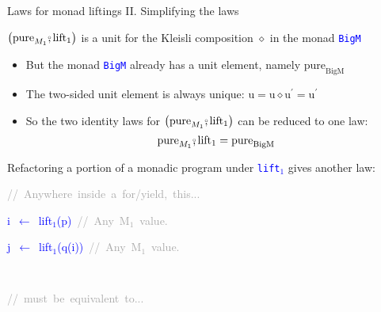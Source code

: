 \documentclass[english]{beamer}
\newenvironment{lyxcode}
  {\par\begin{list}{}{
    \setlength{\rightmargin}{\leftmargin}
    \setlength{\listparindent}{0pt}%
    \raggedright
    \setlength{\itemsep}{0pt}
    \setlength{\parsep}{0pt}
    \normalfont\ttfamily}%
   \def\{{\char`\{}
   \def\}{\char`\}}
   \def\textasciitilde{\char`\~}
   \item[]}
  {\end{list}}
\newcommand{\bef}{\ensuremath\raisebox{2pt}{$\mathsmaller{\mathsmaller{\circ}}$}\hspace{-3.3pt},}
\begin{document}
\begin{frame}{Laws for monad liftings II. Simplifying the laws}

{\footnotesize{}\vspace{-0.2cm}\hspace{-0.0cm}}$\big(\text{pure}_{M_{1}}\bef\text{lift}_{1}\big)$
is a unit for the Kleisli composition $\diamond$ in the monad \texttt{\textcolor{blue}{\footnotesize{}BigM}} 
\begin{itemize}
\item But the monad \texttt{\textcolor{blue}{\footnotesize{}BigM}} already
has a unit element, namely $\text{pure}_{\text{BigM}}$
\item The two-sided unit element is always unique: $\text{u}=\text{u}\diamond\text{u}^{\prime}=\text{u}^{\prime}$
\item So the two identity laws for $\big(\text{pure}_{M_{1}}\bef\text{lift}_{1}\big)$
can be reduced to one law:{\footnotesize{}\vspace{-0.1cm}\hspace{-0.0cm}
\[
\text{pure}_{M_{1}}\bef\text{lift}_{1}=\text{pure}_{\text{BigM}}
\]
}{\footnotesize\par}
\end{itemize}
{\footnotesize{}\vspace{-0.15cm}\hspace{-0.0cm}}Refactoring a portion
of a monadic program under \texttt{\textcolor{blue}{\footnotesize{}lift$_{1}$}}
gives another law:

{\footnotesize{}\vspace{-0.2cm}\hspace{-0.0cm}}\texttt{\textcolor{blue}{\footnotesize{}}}%
\begin{minipage}[t]{0.58\columnwidth}%
\begin{lyxcode}
\textrm{\textcolor{darkgray}{\footnotesize{}//~Anywhere~inside~a~for/yield,~this...}}{\footnotesize\par}

\textcolor{blue}{\footnotesize{}i~$\leftarrow$~lift$_{1}$(p)~}\textrm{\textcolor{darkgray}{\footnotesize{}//~Any~M$_{1}$~value.}}{\footnotesize\par}

\textcolor{blue}{\footnotesize{}j~$\leftarrow$~lift$_{1}$(q(i))~}\textrm{\textcolor{darkgray}{\footnotesize{}//~Any~M$_{1}$~value.}}{\footnotesize\par}
\end{lyxcode}
%
\end{minipage}\texttt{\textcolor{blue}{\footnotesize{}~ }}%
\begin{minipage}[t]{0.5\columnwidth}%
\begin{lyxcode}
\textrm{\textcolor{darkgray}{\footnotesize{}//~must~be~equivalent~to...}}{\footnotesize\par}


\end{lyxcode}
\end{minipage}
\end{frame}
\end{document}
